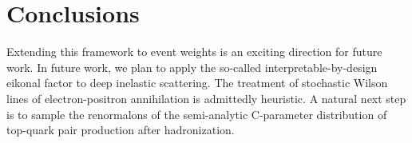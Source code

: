 \section{Conclusions}\label{sec:conclusions}

Extending this framework to event weights is an exciting direction for
future work. In future work, we plan to apply the so-called
interpretable-by-design eikonal factor to deep inelastic scattering. The
treatment of stochastic Wilson lines of electron-positron annihilation
is admittedly heuristic. A natural next step is to sample the
renormalons of the semi-analytic C-parameter distribution of top-quark
pair production after hadronization.

